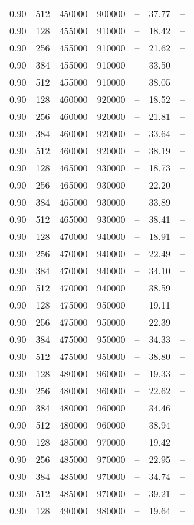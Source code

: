 \begin{tabular}{l|l|l|l|l|l|l}
0.90 & 512 & 450000 & 900000 & -- & 37.77 & --\\
0.90 & 128 & 455000 & 910000 & -- & 18.42 & --\\
0.90 & 256 & 455000 & 910000 & -- & 21.62 & --\\
0.90 & 384 & 455000 & 910000 & -- & 33.50 & --\\
0.90 & 512 & 455000 & 910000 & -- & 38.05 & --\\
0.90 & 128 & 460000 & 920000 & -- & 18.52 & --\\
0.90 & 256 & 460000 & 920000 & -- & 21.81 & --\\
0.90 & 384 & 460000 & 920000 & -- & 33.64 & --\\
0.90 & 512 & 460000 & 920000 & -- & 38.19 & --\\
0.90 & 128 & 465000 & 930000 & -- & 18.73 & --\\
0.90 & 256 & 465000 & 930000 & -- & 22.20 & --\\
0.90 & 384 & 465000 & 930000 & -- & 33.89 & --\\
0.90 & 512 & 465000 & 930000 & -- & 38.41 & --\\
0.90 & 128 & 470000 & 940000 & -- & 18.91 & --\\
0.90 & 256 & 470000 & 940000 & -- & 22.49 & --\\
0.90 & 384 & 470000 & 940000 & -- & 34.10 & --\\
0.90 & 512 & 470000 & 940000 & -- & 38.59 & --\\
0.90 & 128 & 475000 & 950000 & -- & 19.11 & --\\
0.90 & 256 & 475000 & 950000 & -- & 22.39 & --\\
0.90 & 384 & 475000 & 950000 & -- & 34.33 & --\\
0.90 & 512 & 475000 & 950000 & -- & 38.80 & --\\
0.90 & 128 & 480000 & 960000 & -- & 19.33 & --\\
0.90 & 256 & 480000 & 960000 & -- & 22.62 & --\\
0.90 & 384 & 480000 & 960000 & -- & 34.46 & --\\
0.90 & 512 & 480000 & 960000 & -- & 38.94 & --\\
0.90 & 128 & 485000 & 970000 & -- & 19.42 & --\\
0.90 & 256 & 485000 & 970000 & -- & 22.95 & --\\
0.90 & 384 & 485000 & 970000 & -- & 34.74 & --\\
0.90 & 512 & 485000 & 970000 & -- & 39.21 & --\\
0.90 & 128 & 490000 & 980000 & -- & 19.64 & --\\

\end{tabular}
